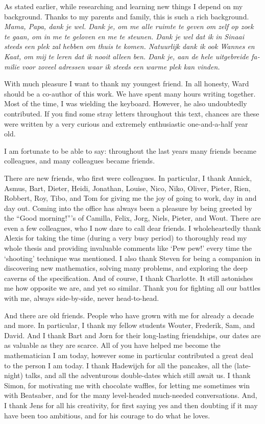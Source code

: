 As stated earlier, while researching and learning new things I depend on my background. Thanks to my parents and family, this is such a rich background. \emph{\foreignlanguage{dutch}{Mama, Papa, dank je wel. Dank je, om me alle ruimte te geven om zelf op zoek te gaan, om in me te geloven en me te steunen. Dank je wel dat ik in Sinaai steeds een plek zal hebben om thuis te komen. Natuurlijk dank ik ook Wannes en Kaat, om mij te leren dat ik nooit alleen ben. Dank je, aan de hele uitgebreide familie voor zoveel adressen waar ik steeds een warme plek kan vinden.}}

With much pleasure I want to thank my youngest friend. In all honesty, Ward should be a co-author of this work. We have spent many hours writing together. Most of the time, I was wielding the keyboard. However, he also undoubtedly contributed. If you find some stray letters throughout this text, chances are these were written by a very curious and extremely enthusiastic one-and-a-half year old.

I am fortunate to be able to say: throughout the last years many friends became colleagues, and many colleagues became friends.

There are new friends, who first were colleagues. In particular, I thank Annick, Asmus, Bart, Dieter, Heidi, Jonathan, Louise, Nico, Niko, Oliver, Pieter, Rien, Robbert, Roy, Tibo, and Tom for giving me the joy of going to work, day in and day out. Coming into the office has always been a pleasure by being greeted by the ``Good morning!'''s of Camilla, Felix, Jorg, Niels, Pieter, and Wout. There are even a few colleagues, who I now dare to call dear friends. I wholeheartedly thank Alexis for taking the time (during a very busy period) to thoroughly read my whole thesis and providing invaluable comments like `Pew pew!' every time the `shooting' technique was mentioned. I also thank Steven for being a companion in discovering new mathematics, solving many problems, and exploring the deep caverns of the \cpp{} specification. And of course, I thank Charlotte. It still astonishes me how opposite we are, and yet so similar. Thank you for fighting all our battles with me, always side-by-side, never head-to-head. 

And there are old friends. People who have grown with me for already a decade and more. In particular, I thank my fellow students Wouter, Frederik, Sam, and David. And I thank Bart and Jorn for their long-lasting friendships, our dates are as valuable as they are scarce. All of you have helped me become the mathematician I am today, however some in particular contributed a great deal to the person I am today. I thank Hadewijch for all the pancakes, all the (late-night) talks, and all the adventurous double-dates which still await us. I thank Simon, for motivating me with chocolate waffles, for letting me sometimes win with Beatsaber, and for the many level-headed much-needed conversations. And, I thank Jens for all his creativity, for first saying yes and then doubting if it may have been too ambitious, and for his courage to do what he loves. 

